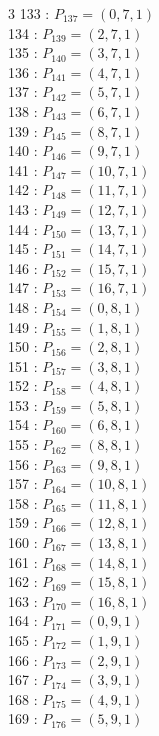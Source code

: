 \documentclass{article}
\begin{document}
{\begin{multicols}{3}
133 : $P_{137}=( 0, 7, 1 )$\\
134 : $P_{139}=( 2, 7, 1 )$\\
135 : $P_{140}=( 3, 7, 1 )$\\
136 : $P_{141}=( 4, 7, 1 )$\\
137 : $P_{142}=( 5, 7, 1 )$\\
138 : $P_{143}=( 6, 7, 1 )$\\
139 : $P_{145}=( 8, 7, 1 )$\\
140 : $P_{146}=( 9, 7, 1 )$\\
141 : $P_{147}=( 10, 7, 1 )$\\
142 : $P_{148}=( 11, 7, 1 )$\\
143 : $P_{149}=( 12, 7, 1 )$\\
144 : $P_{150}=( 13, 7, 1 )$\\
145 : $P_{151}=( 14, 7, 1 )$\\
146 : $P_{152}=( 15, 7, 1 )$\\
147 : $P_{153}=( 16, 7, 1 )$\\
148 : $P_{154}=( 0, 8, 1 )$\\
149 : $P_{155}=( 1, 8, 1 )$\\
150 : $P_{156}=( 2, 8, 1 )$\\
151 : $P_{157}=( 3, 8, 1 )$\\
152 : $P_{158}=( 4, 8, 1 )$\\
153 : $P_{159}=( 5, 8, 1 )$\\
154 : $P_{160}=( 6, 8, 1 )$\\
155 : $P_{162}=( 8, 8, 1 )$\\
156 : $P_{163}=( 9, 8, 1 )$\\
157 : $P_{164}=( 10, 8, 1 )$\\
158 : $P_{165}=( 11, 8, 1 )$\\
159 : $P_{166}=( 12, 8, 1 )$\\
160 : $P_{167}=( 13, 8, 1 )$\\
161 : $P_{168}=( 14, 8, 1 )$\\
162 : $P_{169}=( 15, 8, 1 )$\\
163 : $P_{170}=( 16, 8, 1 )$\\
164 : $P_{171}=( 0, 9, 1 )$\\
165 : $P_{172}=( 1, 9, 1 )$\\
166 : $P_{173}=( 2, 9, 1 )$\\
167 : $P_{174}=( 3, 9, 1 )$\\
168 : $P_{175}=( 4, 9, 1 )$\\
169 : $P_{176}=( 5, 9, 1 )$\\

\end{multicols}}
\end{document}
